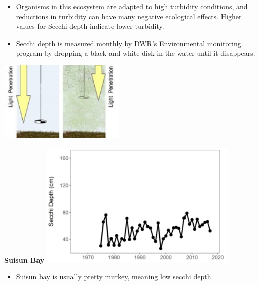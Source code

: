\documentclass[]{article}\usepackage[]{graphicx}\usepackage[]{color}
\begin{document}
\vspace{1cm}

\begin{Row}
  \begin{Cell}{7}
    \begin{center}
        \begin{itemize}[leftmargin=1cm,rightmargin=1cm]
          \item Organisms in this ecosystem are adapted to high turbidity conditions, 
          and reductions in turbidity can have many negative ecological effects. Higher 
          values for Secchi depth indicate lower turbidity.
          \item Secchi depth is measured monthly by DWR’s Environmental monitoring 
          program by dropping a black-and-white disk in the water until it disappears.
        \end{itemize}
        \vspace{0.5cm}
        \includegraphics[width=6cm,align=m]{figures/secchi/secchi_diagram.jpg}
    \end{center}
  \end{Cell}
  \begin{Cell}{6}
    \begin{center}
      {\bf {\large Suisun Bay}}
      \includegraphics[width=9.5cm,align=m]{figures/secchi/secchi_suisun_bay_tmp.png}
      \vspace{0.5cm}
      \begin{itemize}[leftmargin=2cm,rightmargin=0.5cm]
        \item Suisun bay is usually pretty murkey, meaning low secchi depth.
      \end{itemize}
    \end{center}
  \end{Cell}
\end{Row}
\end{document}
